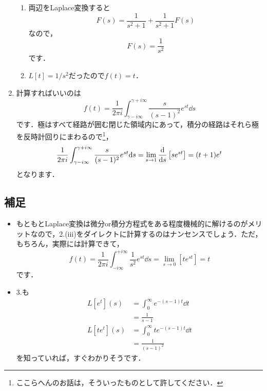 \documentclass[a4paper,pdflatex,ja=standard]{bxjsarticle}
\begin{document}
\begin{enumerate}
\begin{enumerate}
    \item 
    両辺をLaplace変換すると
    \begin{equation}
      F(s)
      =
      \frac{1}{s^2+1}
      +
      \frac{1}{s^2+1}F(s)
    \end{equation}
    なので，
    \begin{equation}
      F(s)
      =
      \frac{1}{s^2}
    \end{equation}
    です．

    \item 
    $L[t]=1/s^2$だったので$f(t)=t$．
  \end{enumerate}
  
  \item 
  計算すればいいのは
  \begin{equation}
    f(t)
    =
    \frac{1}{2\pi i}
    \int_{\gamma-i\infty}^{\gamma+i\infty}
    \frac{s}{(s-1)^2}e^{st}
    \dd s
  \end{equation}
  です．極はすべて経路が囲む閉じた領域内にあって，積分の経路はそれら極を反時計回りにまわるので\footnote{
    ここらへんのお話は，そういったものとして許してください．
  }，
  \begin{equation}
    \frac{1}{2\pi i}\int_{\gamma-i\infty}^{\gamma+i\infty}
    \frac{s}{(s-1)^2}e^{st}
    \dd s
    =
    \lim_{s\rightarrow1}
    \dv{}{s}\left[  
      se^{st}
    \right]
    =
    (t+1)e^t
  \end{equation}
  となります．

\end{enumerate}

\subsection*{補足}

\begin{itemize}
  \item 
  もともとLaplace変換は微分or積分方程式をある程度機械的に解けるのがメリットなので，2.(iii)をダイレクトに計算するのはナンセンスでしょう．ただ，もちろん，実際には計算できて，
  \begin{equation}
    f(t)
    =
    \frac{1}{2\pi i}
    \int_{-i\infty}^{+i\infty}
    \frac{1}{s^2}e^{st}
    \dd s
    =
    \lim_{s\rightarrow0}
    \left[ te^{st} \right]
    =
    t
  \end{equation}
  です．

  \item 
  3.も
  \begin{align}
    L[e^t](s)
    &=
    \int_0^\infty
    e^{-(s-1)t}
    \dd t
    \nonumber
    \\
    &=
    \frac{1}{s-1}
    \\
    L[te^t](s)
    &=
    \int_0^\infty
    te^{-(s-1)t}
    \dd t
    \nonumber
    \\
    &=
    \frac{1}{(s-1)^2}
  \end{align}
  を知っていれば，すぐわかりそうです．

\end{itemize}
\end{document}
